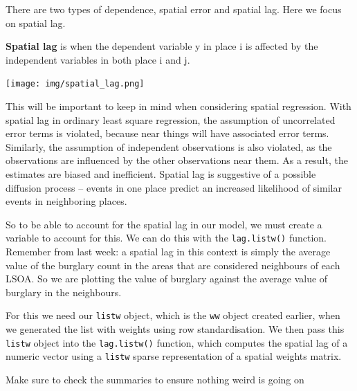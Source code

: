 \documentclass[]{book}
\newenvironment{Shaded}{\begin{snugshade}}{\end{snugshade}}
\newcommand{\CommentTok}[1]{\textcolor[rgb]{0.56,0.35,0.01}{\textit{#1}}}
\newcommand{\KeywordTok}[1]{\textcolor[rgb]{0.13,0.29,0.53}{\textbf{#1}}}
\newcommand{\NormalTok}[1]{#1}
\newcommand{\OperatorTok}[1]{\textcolor[rgb]{0.81,0.36,0.00}{\textbf{#1}}}
\newcommand{\StringTok}[1]{\textcolor[rgb]{0.31,0.60,0.02}{#1}}
\begin{document}
There are two types of dependence, spatial error and spatial lag. Here we focus on spatial lag.

\textbf{Spatial lag} is when the dependent variable y in place i is affected by the independent variables in both place i and j.

\texttt{[image: img/spatial\_lag.png]}

This will be important to keep in mind when considering spatial regression. With spatial lag in ordinary least square regression, the assumption of uncorrelated error terms is violated, because near things will have associated error terms. Similarly, the assumption of independent observations is also violated, as the observations are influenced by the other observations near them. As a result, the estimates are biased and inefficient. Spatial lag is suggestive of a possible diffusion process -- events in one place predict an increased likelihood of similar events in neighboring places.

So to be able to account for the spatial lag in our model, we must create a variable to account for this. We can do this with the \texttt{lag.listw()} function. Remember from last week: a spatial lag in this context is simply the average value of the burglary count in the areas that are considered neighbours of each LSOA. So we are plotting the value of burglary against the average value of burglary in the neighbours.

For this we need our \texttt{listw} object, which is the \texttt{ww} object created earlier, when we generated the list with weights using row standardisation. We then pass this \texttt{listw} object into the \texttt{lag.listw()} function, which computes the spatial lag of a numeric vector using a \texttt{listw} sparse representation of a spatial weights matrix.

\begin{Shaded}
\end{Shaded}

Make sure to check the summaries to ensure nothing weird is going on

\begin{Shaded}
\end{Shaded}
\end{document}
